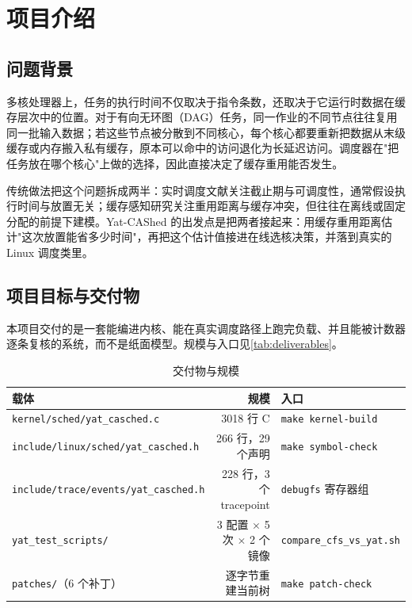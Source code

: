 
\section{项目介绍} \label{sec:intro}

\subsection{问题背景}

多核处理器上，任务的执行时间不仅取决于指令条数，还取决于它运行时数据在缓存层次中的位置。对于有向无环图（DAG）任务，同一作业的不同节点往往复用同一批输入数据；若这些节点被分散到不同核心，每个核心都要重新把数据从末级缓存或内存搬入私有缓存，原本可以命中的访问退化为长延迟访问。调度器在"把任务放在哪个核心"上做的选择，因此直接决定了缓存重用能否发生。

传统做法把这个问题拆成两半：实时调度文献关注截止期与可调度性，通常假设执行时间与放置无关；缓存感知研究关注重用距离与缓存冲突，但往往在离线或固定分配的前提下建模。Yat-CAShed 的出发点是把两者接起来：用缓存重用距离估计"这次放置能省多少时间"，再把这个估计值接进在线选核决策，并落到真实的 Linux 调度类里。

\subsection{项目目标与交付物}

本项目交付的是一套能编进内核、能在真实调度路径上跑完负载、并且能被计数器逐条复核的系统，而不是纸面模型。规模与入口见\autoref{tab:deliverables}。

\begin{table}[H]
\centering
\caption{交付物与规模}
\label{tab:deliverables}
\small
\begin{tabular}{@{}lrl@{}}
\toprule
载体 & 规模 & 入口 \\
\midrule
\texttt{kernel/sched/yat\_casched.c} & 3018 行 C & \texttt{make kernel-build} \\
\texttt{include/linux/sched/yat\_casched.h} & 266 行，29 个声明 & \texttt{make symbol-check} \\
\texttt{include/trace/events/yat\_casched.h} & 228 行，3 个 tracepoint & \texttt{debugfs} 寄存器组 \\
\texttt{yat\_test\_scripts/} & 3 配置 $\times$ 5 次 $\times$ 2 个镜像 & \texttt{compare\_cfs\_vs\_yat.sh} \\
\texttt{patches/}（6 个补丁） & 逐字节重建当前树 & \texttt{make patch-check} \\
\bottomrule
\end{tabular}
\end{table}

